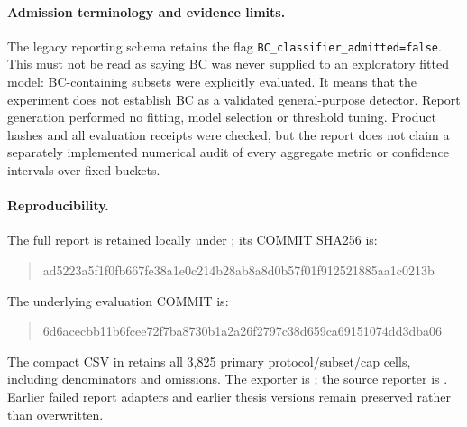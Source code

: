 \paragraph{Admission terminology and evidence limits.}
The legacy reporting schema retains the flag
\texttt{BC\_classifier\_admitted=false}. This must not be read as saying BC was
never supplied to an exploratory fitted model: BC-containing subsets were
explicitly evaluated. It means that the experiment does not establish BC as a
validated general-purpose detector. Report generation performed no fitting,
model selection or threshold tuning. Product hashes and all evaluation receipts
were checked, but the report does not claim a separately implemented numerical
audit of every aggregate metric or confidence intervals over fixed buckets.

\paragraph{Reproducibility.}
The full report is retained locally under
; its COMMIT
SHA256 is:
\begin{quote}\scriptsize\ttfamily
ad5223a5f1f0fb667fe38a1e0c214b28ab8a8d0b57f01f912521885aa1c0213b
\end{quote}
The underlying evaluation COMMIT is:
\begin{quote}\scriptsize\ttfamily
6d6acecbb11b6fcee72f7ba8730b1a2a26f2797c38d659ca69151074dd3dba06
\end{quote}
The compact CSV in  retains all
3,825 primary protocol/subset/cap cells, including denominators and omissions.
The exporter is ; the source reporter is
. Earlier failed report adapters and
earlier thesis versions remain preserved rather than overwritten.
